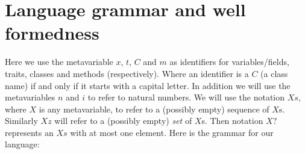 \section{Language grammar and well formedness}


Here we use the metavariable $x$, $t$, $C$ and $m$ as identifiers for variables/fields, traits, classes and methods (respectively). Where an identifier is a $C$ (a class name) if and only if it starts with a capital letter. In addition we will use the metavariables $n$ and $i$ to refer to natural numbers. We will use the notation $Xs$, where $X$ is any metavariable, to refer to a (possibly empty) sequence of $X$s. Similarly $Xz$ will refer to a (possibly empty) \emph{set} of $X$s.  Then notation $X?$ represents an $Xs$ with at most one element. Here is the grammar for our language:

